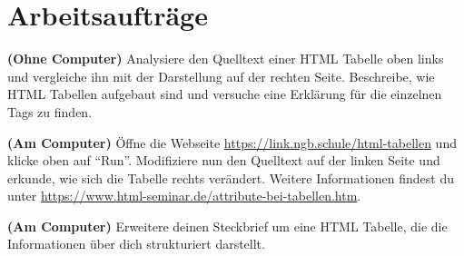 \documentclass[a4paper,11pt,debug]{scrartcl}
\begin{document}
\section*{Arbeitsaufträge}
\begin{aufgabe}[symbol=\symHeft]
	\textbf{(Ohne Computer)}
	Analysiere den Quelltext einer HTML Tabelle oben links und vergleiche ihn mit der Darstellung auf der rechten Seite. Beschreibe, wie HTML Tabellen aufgebaut sind und versuche eine Erklärung für die einzelnen Tags zu finden.
\end{aufgabe}
\begin{aufgabe}[symbol=\symLaptop]
	\textbf{(Am Computer)}
	Öffne die Webseite \url{https://link.ngb.schule/html-tabellen} und klicke oben auf \enquote{Run}. Modifiziere nun den Quelltext auf der linken Seite und erkunde, wie sich die Tabelle rechts verändert. Weitere Informationen findest du unter \url{https://www.html-seminar.de/attribute-bei-tabellen.htm}.
\end{aufgabe}
\begin{aufgabe}[symbol=\symLaptop]
	\textbf{(Am Computer)}
	Erweitere deinen Steckbrief um eine HTML Tabelle, die die Informationen über dich strukturiert darstellt.
\end{aufgabe}
\end{document}
